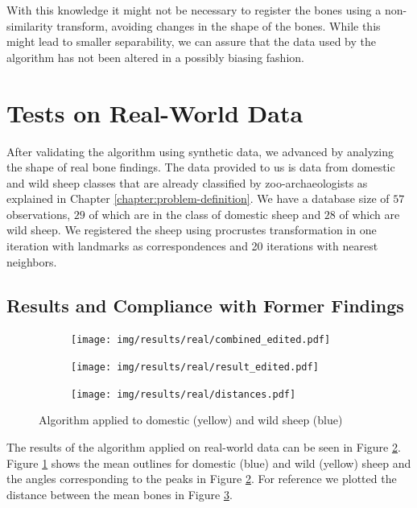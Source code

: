 \documentclass[pdftex,12pt,a4paper]{report}
\begin{document}
With this knowledge it might not be necessary to register the bones using a non-similarity transform, avoiding changes in the shape of the bones. While this might lead to smaller separability, we can assure that the data used by the algorithm has not been altered in a possibly biasing fashion.

\section{Tests on Real-World Data}

After validating the algorithm using synthetic data, we advanced by analyzing the shape of real bone findings. The data provided to us is data from domestic and wild sheep classes that are already classified by zoo-archaeologists as explained in Chapter \ref{chapter:problem-definition}. We have a database size of $57$ observations, $29$ of which are in the class of domestic sheep and $28$ of which are wild sheep. We registered the sheep using procrustes transformation in one iteration with landmarks as correspondences and 20 iterations with nearest neighbors.

\subsection{Results and Compliance with Former Findings} 

\begin{figure}
	\centering
	\begin{subfigure}[b]{0.32\textwidth}
		\centering
		\texttt{[image: img/results/real/combined\_edited.pdf]}
		\label{fig:main-result-data}
	\end{subfigure}
	\begin{subfigure}[b]{0.32\textwidth}
		\centering
		\texttt{[image: img/results/real/result\_edited.pdf]}
		\label{fig:main-result-chart}
	\end{subfigure}
	\begin{subfigure}[b]{0.32\textwidth}
		\centering
		\texttt{[image: img/results/real/distances.pdf]}
		\label{fig:main-result-distance}
	\end{subfigure}
	\caption{Algorithm applied to domestic (yellow) and wild sheep (blue)}
	\label{fig:main-result}
\end{figure}

The results of the algorithm applied on real-world data can be seen in Figure \ref{fig:main-result-chart}. Figure \ref{fig:main-result-data} shows the mean outlines for domestic (blue) and wild (yellow) sheep and the angles corresponding to the peaks in Figure \ref{fig:main-result-chart}. For reference we plotted the distance between the mean bones in Figure \ref{fig:main-result-distance}.
\end{document}
